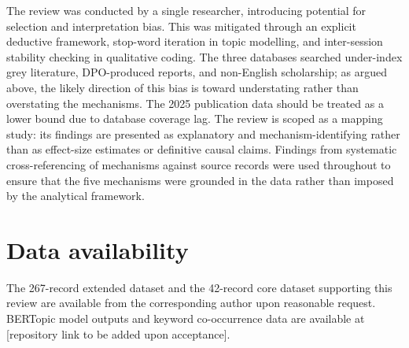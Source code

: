 \documentclass[12pt,a4paper]{article}
\begin{document}
The review was conducted by a single researcher, introducing potential for selection and interpretation bias. This was mitigated through an explicit deductive framework, stop-word iteration in topic modelling, and inter-session stability checking in qualitative coding. The three databases searched under-index grey literature, DPO-produced reports, and non-English scholarship; as argued above, the likely direction of this bias is toward understating rather than overstating the mechanisms. The 2025 publication data should be treated as a lower bound due to database coverage lag. The review is scoped as a mapping study: its findings are presented as explanatory and mechanism-identifying rather than as effect-size estimates or definitive causal claims. Findings from systematic cross-referencing of mechanisms against source records were used throughout to ensure that the five mechanisms were grounded in the data rather than imposed by the analytical framework.


\section*{Data availability}

The 267-record extended dataset and the 42-record core dataset supporting this review are available from the corresponding author upon reasonable request. BERTopic model outputs and keyword co-occurrence data are available at [repository link to be added upon acceptance].


\printbibliography
\end{document}
